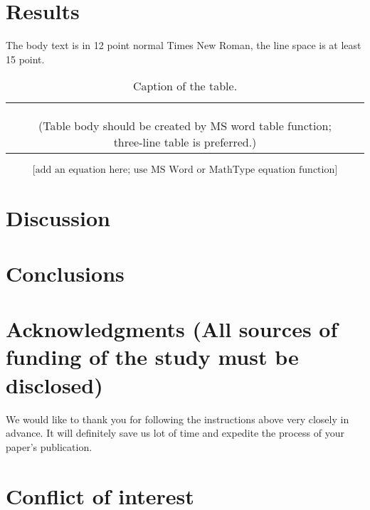 \documentclass{aims}
\numberwithin{equation}{section}
\begin{document}
\section{Results}
The body text is in 12 point normal Times New Roman, 
the line space is at least 15 point.
 
\begin{table}[H]
\begin{center}
\caption{Caption of the table.}
\begin{tabular}{ccc} \hline
 & & \\\hline
 & & \\
 & & \\
 & & \\\hline
 &(Table body should be created by MS word table function; three-line table is preferred.)
\end{tabular}
\end{center}
\end{table}


\begin{equation}
  \text{[add an equation here; use MS Word or MathType equation function]}
\end{equation}

\section{Discussion}

\section{Conclusions}

\section*{Acknowledgments (All sources of funding of the study must be disclosed)}
We would like to thank you for following the instructions above 
very closely in advance. It will definitely save us lot of 
time and expedite the process of your paper's publication.

\section*{Conflict of interest}
\end{document}
